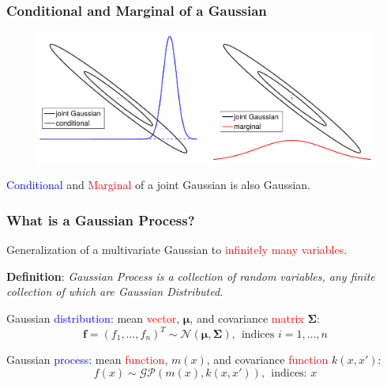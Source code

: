 \documentclass[10pt]{beamer}
\newcommand{\gp}{\mathcal{GP}}
\newcommand{\gaussN}{\mathcal{N}}
\newcommand{\bmu}{\boldsymbol{\mu}}
\newcommand{\bSig}{\boldsymbol{\Sigma}}
\begin{document}
  \begin{frame}
    \frametitle{Conditional and Marginal of a Gaussian}

    \begin{figure}
      \centering
      \includegraphics[width=\textwidth]{gaussDist2.png}
    \end{figure}

    \begin{center}
      \textcolor{blue}{Conditional} and \textcolor{red}{Marginal} of a joint Gaussian is also Gaussian.
    \end{center}

  \end{frame}

  \begin{frame}
    \frametitle{What is a Gaussian Process?}
    Generalization of a multivariate Gaussian to \textcolor{red}{infinitely many variables}.

    \begin{block}{}
      \textbf{Definition}: \emph{Gaussian Process is a collection of random variables, any finite collection of which are Gaussian Distributed.}
    \end{block}

    Gaussian \textcolor{blue}{distribution}: mean \textcolor{red}{vector}, $\bmu$, and covariance \textcolor{red}{matrix} $\bSig$:
    \begin{equation*}
      \mathbf{f} = (f_1,\dots,f_n)^T \sim \gaussN(\bmu,\bSig),~~\text{indices } i = 1,\dots,n
    \end{equation*}

    Gaussian \textcolor{blue}{process}: mean \textcolor{red}{function}, $m(x)$, and covariance \textcolor{red}{function} $k(x,x')$:
    \begin{equation*}
      f(x) \sim \gp(m(x),k(x,x')),~~\text{indices: } x
    \end{equation*}
  \end{frame}
\end{document}
